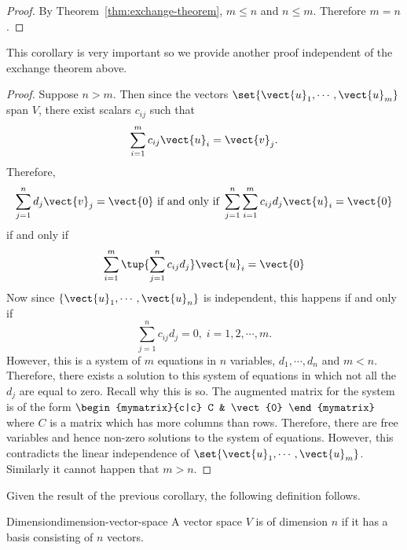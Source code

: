\begin{proof} By Theorem~\ref{thm:exchange-theorem}, $m\leq n$ and $n\leq m$. Therefore $m=n$. 
\end{proof}

This corollary is very important so we provide another proof independent of the exchange theorem above.

\begin{proof}Suppose $n > m$. Then since the vectors $\set{\vect{u}
_{1},\cdots ,\vect{u}_{m}} $ span $V$, there exist scalars $c_{ij}$
such that 
\begin{equation*}
\sum_{i=1}^{m}c_{ij}\vect{u}_{i}=\vect{v}_{j}.
\end{equation*}
Therefore, 
\begin{equation*}
\sum_{j=1}^{n}d_{j}\vect{v}_{j}=\vect{0}
\text{ if and only if }\sum_{j=1}^{n}\sum_{i=1}^{m}c_{ij}d_{j}\vect{u}_{i}=
\vect{0}
\end{equation*}
if and only if 
\begin{equation*}
\sum_{i=1}^{m}\tup{\sum_{j=1}^{n}c_{ij}d_{j}} \vect{u}_{i}=\vect{
0}
\end{equation*}
Now since $\{\vect{u}_{1},\cdots ,\vect{u}_{n}\}$ is independent, this
happens if and only if 
\begin{equation*}
\sum_{j=1}^{n}c_{ij}d_{j}=0,\;i=1,2,\cdots ,m.
\end{equation*}
However, this is a system of $m$ equations in $n$ variables, $d_{1},\cdots
,d_{n}$ and $m<n$. Therefore, there exists a solution to this system of
equations in which not all the $d_{j}$ are equal to zero. Recall why this is
so. The augmented matrix for the system is of the form 
$\begin{mymatrix}{c|c}
C & \vect{0}
\end{mymatrix} $ where $C$ is a matrix which has more columns than rows. Therefore,
there are free variables and hence non-zero solutions to the system of
equations. However, this contradicts the linear independence of $\set{
\vect{u}_{1},\cdots ,\vect{u}_{m}}$. Similarly it cannot happen
that $m > n$.
\end{proof}

Given the result of the previous corollary, the following definition follows.

\begin{definition}{Dimension}{dimension-vector-space}
 A vector space $V$ is of dimension $n$ if it has a basis consisting of $n$ vectors.
\end{definition}

